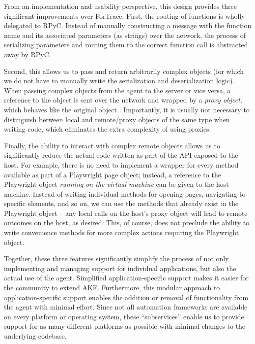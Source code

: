 \documentclass[final,5p,times,twocolumn]{elsarticle}
\begin{document}
From an implementation and usability perspective, this design provides
three significant improvements over ForTrace. First, the routing of
functions is wholly delegated to RPyC. Instead of manually constructing
a message with the function name and its associated parameters (as
strings) over the network, the process of serializing parameters and
routing them to the correct function call is abstracted away by RPyC.

Second, this allows us to pass and return arbitrarily complex objects
(for which we do not have to manually write the serialization and
deserialization logic). When passing complex objects from the agent to
the server or vice versa, a reference to the object is sent over the
network and wrapped by a \emph{proxy object}, which behaves like the
original object \cite{TheoryOperationRPyC}. Importantly, it is
usually not necessary to distinguish between local and remote/proxy
objects of the same type when writing code, which eliminates the extra
complexity of using proxies.

Finally, the ability to interact with complex remote objects allows us
to significantly reduce the actual code written as part of the API
exposed to the host. For example, there is no need to implement a
wrapper for every method available as part of a Playwright page object;
instead, a reference to the Playwright object \emph{running on the
virtual machine} can be given to the host machine. Instead of writing
individual methods for opening pages, navigating to specific elements,
and so on, we can use the methods that already exist in the Playwright
object -- any local calls on the host's proxy object will lead to remote
outcomes on the host, as desired. This, of course, does not preclude the
ability to write convenience methods for more complex actions requiring
the Playwright object.

Together, these three features significantly simplify the process of not
only implementing and managing support for individual applications, but
also the actual use of the agent. Simplified application-specific
support makes it easier for the community to extend AKF. Furthermore,
this modular approach to application-specific support enables the
addition or removal of functionality from the agent with minimal effort.
Since not all automation frameworks are available on every platform or
operating system, these ``subservices'' enable us to provide support for
as many different platforms as possible with minimal changes to the
underlying codebase.
\end{document}
